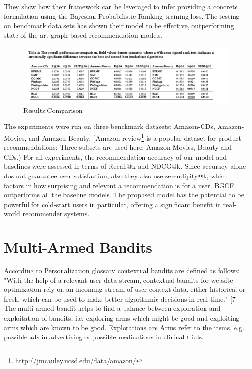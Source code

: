 They show how their framework can be leveraged to infer providing a concrete formulation using the Bayesian Probabilistic Ranking training loss. The testing on benchmark data sets has shown their model to be effective, outperforming state-of-the-art graph-based recommendation models. 

\begin{figure}[hh!]
    \centering
    \includegraphics[width=125mm]{BGCF_results_comparison.png}
    \caption{Results Comparison
    \label{overflow}}
\end{figure}

The experiments were run on three benchmark datasets: Amazon-CDs, Amazon-Movies, and Amazon-Beauty. (Amazon-review\footnote{ http://jmcauley.ucsd.edu/data/amazon/} is a popular dataset for product recommendations: Three subsets are used here: Amazon-Movies, Beauty and CDs.) For all experiments, the recommendation accuracy of our model and baselines were assessed in terms of Recall@k and NDCG@k. Since accuracy alone dos not guarantee user satisfaction, also they also use serendipity@k, which factors in how surprising and relevant a recommendation is for a user. BGCF outperforms all the baseline models. 
The proposed model has the potential to be powerful for cold-start users in particular, offering a significant benefit in real-world recommender systems.

\chapter{Multi-Armed Bandits}

According to Personalization glossary contextual bandits are defined as follows: "With the help of a relevant user data stream, contextual bandits for website optimization rely on an incoming stream of user context data, either historical or fresh, which can be used to make better algorithmic decisions in real time." [7]
The multi-armed bandit helps to find a balance between exploration and exploitation of bandits, i.e. exploring arms which might be good and exploiting arms which are known to be good. Explorations are  Arms refer to the items, e.g. possible ads in advertizing or possible medications in clinical trials.

